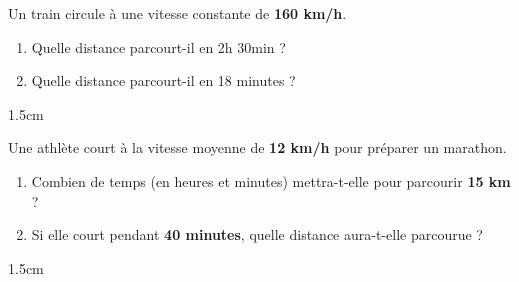 \documentclass[a4paper]{book}
\begin{document}
    \begin{exercice}
        Un train circule à une vitesse constante de \textbf{160 km/h}. 
        \begin{enumerate}
            \item Quelle distance parcourt-il en 2h 30min ?
            \item Quelle distance parcourt-il en 18 minutes ?
        \end{enumerate}

        \begin{ZoneReponse}{1.5cm}    
        \end{ZoneReponse}
    \end{exercice}


    \begin{exercice}
        Une athlète court à la vitesse moyenne de \textbf{12 km/h} pour préparer un marathon.
        \begin{enumerate}
            \item Combien de temps (en heures et minutes) mettra-t-elle pour parcourir \textbf{15 km} ?
            \item Si elle court pendant \textbf{40 minutes}, quelle distance aura-t-elle parcourue ?
        \end{enumerate}
        
        \begin{ZoneReponse}{1.5cm}    
        \end{ZoneReponse}
    \end{exercice}
\end{document}
